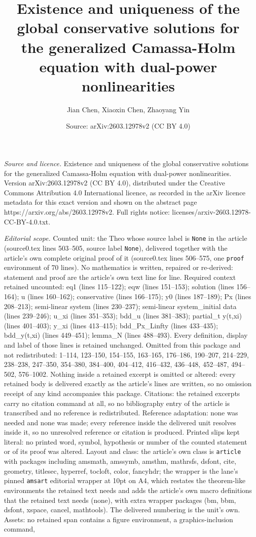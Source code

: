 \documentclass[10pt,a4paper]{amsart}
\title[Existence and uniqueness of the global conservative solution]{Existence and uniqueness of the global conservative solutions for the generalized Camassa-Holm equation with dual-power nonlinearities}
\author{Jian Chen, Xiaoxin Chen, Zhaoyang Yin}
\date{Source: arXiv:2603.12978v2 (CC BY 4.0)}
\begin{document}
\maketitle

\noindent\emph{Source and licence.} Existence and uniqueness of the global conservative solutions for the generalized Camassa-Holm equation with dual-power nonlinearities. Version arXiv:2603.12978v2 (CC BY 4.0), distributed under the Creative Commons Attribution 4.0 International licence, as recorded in the arXiv licence metadata for this exact version and shown on the abstract page https://arxiv.org/abs/2603.12978v2. Full rights notice: licenses/arxiv-2603.12978-CC-BY-4.0.txt.\par\smallskip

\noindent\textit{Editorial scope.} Counted unit: the Theo whose source label is \texttt{None} in the article (source0.tex lines 503--505, source label \texttt{None}), delivered together with the article's own complete original proof of it (source0.tex lines 506--575, one \texttt{proof} environment of 70 lines). No mathematics is written, repaired or re-derived: statement and proof are the article's own text line for line. Required context retained uncounted: eq1 (lines 115--122); eqw (lines 151--153); solution (lines 156--164); u (lines 160--162); conservative (lines 166--175); y0 (lines 187--189); Px (lines 208--213); semi-linear system (lines 230--237); semi-linear system\_initial data (lines 239--246); u\_xi (lines 351--353); bdd\_u (lines 381--383); partial\_t y(t,xi) (lines 401--403); y\_xi (lines 413--415); bdd\_Px\_Linfty (lines 433--435); bdd\_y(t,xi) (lines 449--451); lemma\_N (lines 488--493). Every definition, display and label of those lines is retained unchanged. Omitted from this package and not redistributed: 1--114, 123--150, 154--155, 163--165, 176--186, 190--207, 214--229, 238--238, 247--350, 354--380, 384--400, 404--412, 416--432, 436--448, 452--487, 494--502, 576--1002. Nothing inside a retained excerpt is omitted or altered: every retained body is delivered exactly as the article's lines are written, so no omission receipt of any kind accompanies this package. Citations: the retained excerpts carry no citation command at all, so no bibliography entry of the article is transcribed and no reference is redistributed. Reference adaptation: none was needed and none was made; every reference inside the delivered unit resolves inside it, so no unresolved reference or citation is produced. Printed slips kept literal: no printed word, symbol, hypothesis or number of the counted statement or of its proof was altered. Layout and class: the article's own class is \texttt{article} with packages including amsmath, amssymb, amsthm, mathrsfs, dsfont, cite, geometry, titlesec, hyperref, tocloft, color, fancyhdr; the wrapper is the lane's pinned \texttt{amsart} editorial wrapper at 10pt on A4, which restates the theorem-like environments the retained text needs and adds the article's own macro definitions that the retained text needs (none), with extra wrapper packages (bm, bbm, dsfont, xspace, cancel, mathtools). The delivered numbering is the unit's own. Assets: no retained span contains a figure environment, a graphics-inclusion command, 
\end{document}
